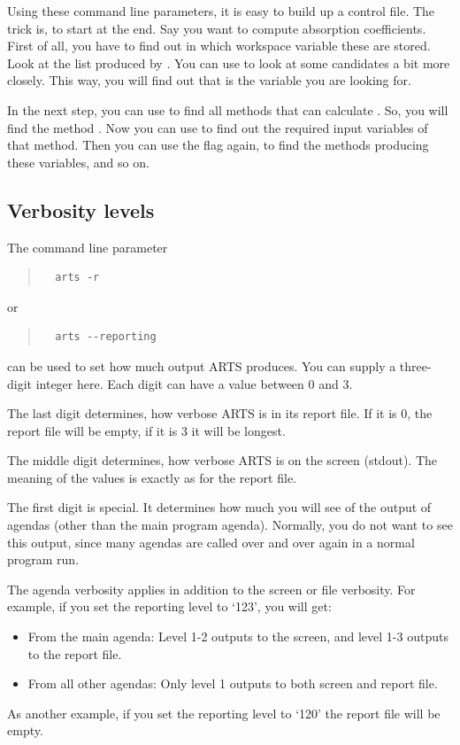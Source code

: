Using these command line parameters, it is easy to build up a
control file. The trick is, to start at the end. Say you want to
compute absorption coefficients. First of all, you have to find out in
which workspace variable these are stored. Look at the list produced
by . You can use  to look at
some candidates a bit more closely. This way, you will find out that
 is the variable you are looking for.

In the next step, you can use  to find
all methods that can calculate . So, you will
find the method . Now you can use
 to find out the required input
variables of that method. Then you can use the  flag
again, to find the methods producing these variables, and so on.


\subsection*{Verbosity levels}
%
The command line parameter 
\begin{quote}
\begin{verbatim}
  arts -r
\end{verbatim}
\end{quote}
or
\begin{quote}
\begin{verbatim}
  arts --reporting
\end{verbatim}
\end{quote}
can be used to set how much output ARTS produces. You can supply a
three-digit integer here. Each digit can have a value between 0 and 3.

The last digit determines, how verbose ARTS is in its report file. If
it is 0, the report file will be empty, if it is 3 it will be longest.

The middle digit determines, how verbose ARTS is on the screen
(stdout). The meaning of the values is exactly as for the report
file. 

The first digit is special. It determines how much you will see of the
output of agendas (other than the main program agenda). Normally, you
do not want to see this output, since many agendas are called over and
over again in a normal program run. 

The agenda verbosity applies in addition to the screen or file
verbosity. For example, if you set the reporting level to `123', you
will get: 
\begin{itemize}
\item From the main agenda: Level 1-2 outputs to the screen, and level
  1-3 outputs to the report file.
\item From all other agendas: Only level 1 outputs to both screen and
  report file.
\end{itemize}
As another example, if you set the reporting level to `120' the
report file will be empty.

